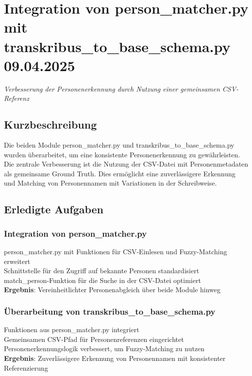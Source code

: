 \documentclass{article}
\begin{document}
\section{Integration von person\_matcher.py mit transkribus\_to\_base\_schema.py \small 09.04.2025}
\small\textit{Verbesserung der Personenerkennung durch Nutzung einer gemeinsamen CSV-Referenz}\\
\subsection*{Kurzbeschreibung}

Die beiden Module person\_matcher.py und transkribus\_to\_base\_schema.py wurden überarbeitet, um eine konsistente Personenerkennung zu gewährleisten. Die zentrale Verbesserung ist die Nutzung der CSV-Datei mit Personenmetadaten als gemeinsame Ground Truth. Dies ermöglicht eine zuverlässigere Erkennung und Matching von Personennamen mit Variationen in der Schreibweise.

\subsection*{Erledigte Aufgaben}
\subsubsection*{\small Integration von person\_matcher.py}
 person\_matcher.py mit Funktionen für CSV-Einlesen und Fuzzy-Matching erweitert\\
 Schnittstelle für den Zugriff auf bekannte Personen standardisiert\\
 match\_person-Funktion für die Suche in der CSV-Datei optimiert\\
\textbf{Ergebnis}: Vereinheitlichter Personenabgleich über beide Module hinweg

\subsubsection*{\small Überarbeitung von transkribus\_to\_base\_schema.py}
 Funktionen aus person\_matcher.py integriert\\
 Gemeinsamen CSV-Pfad für Personenreferenzen eingerichtet\\
 Personenerkennungslogik verbessert, um Fuzzy-Matching zu nutzen\\
\textbf{Ergebnis}: Zuverlässigere Erkennung von Personennamen mit konsistenter Referenzierung
\end{document}
